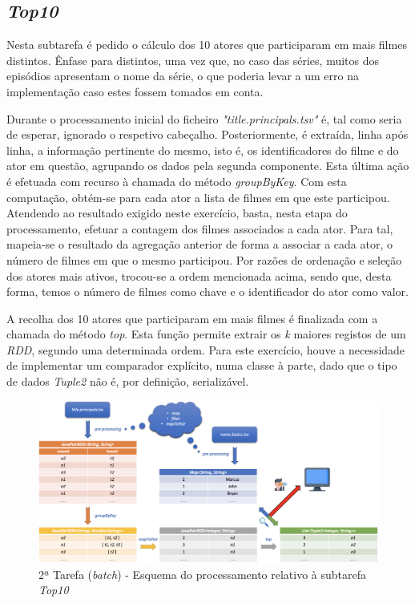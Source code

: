 \documentclass[a4paper]{report}
\begin{document}
        \subsection{\textit{Top10}} \label{subsec:Task2-Top10}
            Nesta subtarefa é pedido o cálculo dos 10 atores que participaram em mais filmes distintos.
            Ênfase para distintos, uma vez que, no caso das séries, muitos dos episódios apresentam o nome da série, o que poderia levar a um erro na implementação caso estes fossem tomados em conta.

            Durante o processamento inicial do ficheiro \textsl{"title.principals.tsv"} é, tal como seria de esperar, ignorado o respetivo cabeçalho.
            Posteriormente, é extraída, linha após linha, a informação pertinente do mesmo, isto é, os identificadores do filme e do ator em questão, agrupando os dados pela segunda componente. 
            Esta última ação é efetuada com recurso à chamada do método \textit{groupByKey}.
            Com esta computação, obtém-se para cada ator a lista de filmes em que este participou.
            Atendendo ao resultado exigido neste exercício, basta, nesta etapa do processamento, efetuar a contagem dos filmes associados a cada ator.
            Para tal, mapeia-se o resultado da agregação anterior de forma a associar a cada ator, o número de filmes em que o mesmo participou.
            Por razões de ordenação e seleção dos atores mais ativos, trocou-se a ordem mencionada acima, sendo que, desta forma, temos o número de filmes como chave e o identificador do ator como valor.

            A recolha dos 10 atores que participaram em mais filmes é finalizada com a chamada do método \textit{top}. Esta função permite extrair os \textit{k} maiores registos de um \textit{RDD}, segundo uma determinada ordem.
            Para este exercício, houve a necessidade de implementar um comparador explícito, numa classe à parte, dado que o tipo de dados \textit{Tuple2} não é, por definição, serializável.

            \begin{figure}[H]
                \centering
                \includegraphics[width=1.0\textwidth]{Images/Task 2 - Top10.png}
                \caption{2ª Tarefa (\textit{batch}) - Esquema do processamento relativo à subtarefa \textit{Top10}}
                \label{fig:17}
            \end{figure}
\end{document}
